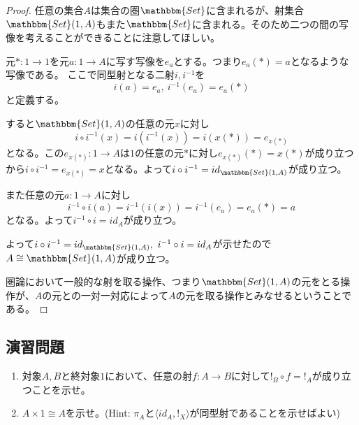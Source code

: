 \documentclass[dvipdfmx]{jsarticle}
\newcommand{\cat}[1]{\mathbbm{#1}}
\newcommand{\arrow}{\rightarrow}
\newcommand{\tuple}[1]{\langle #1\rangle}
\newcommand{\mor}[3]{#1:#2\arrow #3}
\newcommand{\arset}[3]{\cat{#1}(#2,#3)}
\newtheorem{proof}{証明}[section]
\numberwithin{proof}{subsection}
\numberwithin{prop}{subsection}
\numberwithin{define}{subsection}
\begin{document}
	\begin{proof}
		任意の集合$A$は集合の圏$\cat{Set}$に含まれるが、射集合$\arset{Set}{1}{A}$もまた$\cat{Set}$に含まれる。そのため二つの間の写像を考えることができることに注意してほしい。

		元$\mor{*}{1}{1}$を元$\mor{a}{1}{A}$に写す写像を$e_a$とする。つまり$e_a(*)=a$となるような写像である。
		ここで同型射となる二射$i,i^{-1}$を\[i(a)=e_a,\ i^{-1}(e_a)=e_a(*)\]と定義する。
		\begin{center}
		\end{center}
		すると$\arset{Set}{1}{A}$の任意の元$x$に対し
			\[i\circ i^{-1}(x)=i(i^{-1}(x))=i(x(*))=e_{x(*)}\]
		となる。この$\mor{e_{x(*)}}{1}{A}$は$1$の任意の元$*$に対し$e_{x(*)}(*)=x(*)$が成り立つから$i\circ i^{-1}=e_{x(*)}=x$となる。よって$i\circ i^{-1}=id_{\arset{Set}{1}{A}}$が成り立つ。

		また任意の元$\mor{a}{1}{A}$に対し\[i^{-1}\circ i(a)=i^{-1}(i(x))=i^{-1}(e_a)=e_a(*)=a\]となる。よって$i^{-1}\circ i=id_A$が成り立つ。

		よって$i\circ i^{-1}=id_{\arset{Set}{1}{A}},\ i^{-1}\circ i=id_A$が示せたので$A\cong\arset{Set}{1}{A}$が成り立つ。

		圏論において一般的な射を取る操作、つまり$\arset{Set}{1}{A}$の元をとる操作が、$A$の元との一対一対応によって$A$の元を取る操作とみなせるということである。
	\end{proof}
	\subsection{演習問題}
	\begin{enumerate}
		\item 対象$A,B$と終対象$1$において、任意の射$\mor{f}{A}{B}$に対して$!_B\circ f=!_A$が成り立つことを示せ。
		\item $A\times 1\cong A$を示せ。(Hint: $\pi_A$と$\tuple{id_A,!_X}$が同型射であることを示せばよい)
	\end{enumerate}
\end{document}

